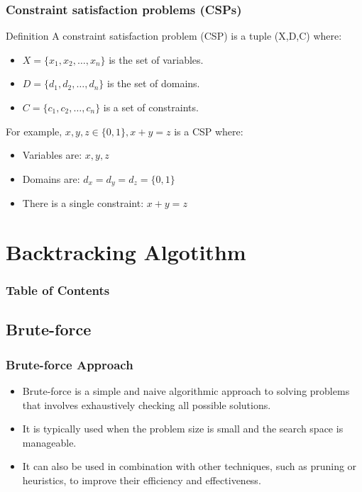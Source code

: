 \documentclass[
	11pt,
]{beamer}
\begin{document}
\begin{frame}
    \frametitle{Constraint satisfaction problems (CSPs)}

    \begin{block}{Definition}
        A constraint satisfaction problem (CSP) is a tuple (X,D,C) where:
        \begin{itemize}
            \item $X=\{x_1,x_2,…,x_n\}$ is the set of variables.
            \item $D=\{d_1,d_2,…,d_n\}$ is the set of domains.
            \item $C=\{c_1,c_2,…,c_n\}$ is a set of constraints.
        \end{itemize}
    \end{block}
    \bigskip
    For example, $x,y,z \in \{0,1\}, x + y = z$ is a CSP where:
    \begin{itemize}
        \item Variables are: $x,y,z$
        \item Domains are: $d_x = d_y = d_z = \{0,1\}$
        \item There is a single constraint: $x + y = z$
    \end{itemize}
\end{frame}
\section{Backtracking Algotithm}
\begin{frame}
    \frametitle{Table of Contents}
    \tableofcontents[currentsection]
\end{frame}
\subsection{Brute-force}
\begin{frame}
	\frametitle{Brute-force Approach}
	\begin{itemize}
		\item Brute-force is a simple and naive algorithmic approach to solving problems that involves exhaustively checking all possible solutions. 
	\bigskip
		\item It is typically used when the problem size is small and the search space is manageable.
	\bigskip
        \item It can also be used in combination with other techniques, such as pruning or heuristics, to improve their efficiency and effectiveness.
    \bigskip
\end{itemize}
\end{frame}
\end{document}
